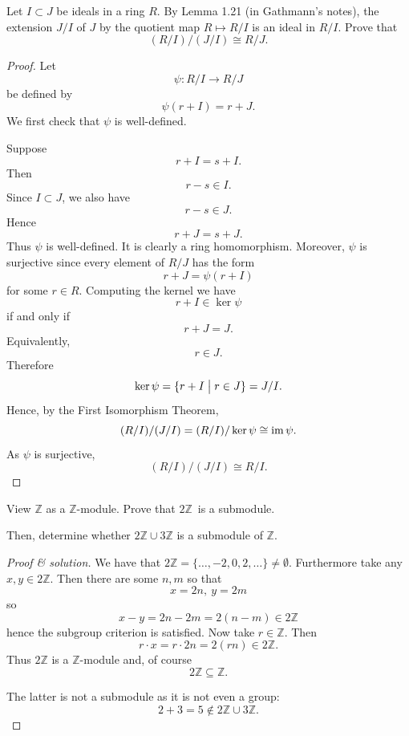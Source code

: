 \documentclass[11pt]{article}
\begin{document}
\begin{prob}[Gathmann 1.22]
    Let $I \subset J$ be ideals in a ring $R$. 
    By Lemma 1.21 (in Gathmann's notes), the extension 
    $J/I$ of $J$ by the quotient map $R \mapsto R/I$
    is an ideal in $R/I$. Prove that 
    \[
        (R/I)/(J/I) \cong R/J. 
    \]
    
\end{prob}
\begin{proof}
    Let 
    \[
        \psi : R/I \to R/J
    \]
    be defined by 
    \[
        \psi(r + I) = r + J.
    \]
    We first check that $\psi$ is well-defined. 

    Suppose 
    \[
        r + I = s + I. 
    \]
    Then 
    \[  
        r-s \in I. 
    \]
    Since $I \subset J$, we also have 
    \[
        r-s \in J. 
    \]
    Hence 
    \[
        r + J = s + J. 
    \]
    Thus $\psi$ is well-defined. 
    It is clearly a ring homomorphism. 
    Moreover, $\psi$ is surjective since every element 
    of $R/J$ has the form  
    \[
        r+J = \psi(r + I)
    \]
    for some $r \in R$. 
    Computing the kernel we have 
    \[
        r + I \in \ker \psi
    \]
    if and only if 
    \[
        r + J = J. 
    \]
    Equivalently, 
    \[
        r \in J. 
    \]
    Therefore 
    \[
        \ker \psi = \{r + I \bigm| r \in J\} = J/I. 
    \]
    Hence, by the First Isomorphism Theorem, 
    \[
        (R/I)/(J/I) = (R/I)/\ker\psi \cong \operatorname{im} \psi. 
    \]
    As $\psi$ is surjective, 
    \[
        (R/I)/(J/I) \cong R/I. 
    \]
\end{proof}

\begin{prob}
    View $\mathbb Z$ as a $\mathbb Z$-module. Prove that 
    $2\mathbb Z$ is a submodule. 

    Then, determine whether $2\mathbb Z \cup 3\mathbb Z$ is 
    a submodule of $\mathbb Z$.
\end{prob}
\begin{proof}[Proof \& solution]
    We have that $2\mathbb Z = \{\ldots, -2, 0, 2, \ldots\} \neq 
    \emptyset$. 
    Furthermore take any $x,y \in 2 \mathbb Z$. Then 
    there are some $n,m$ so that 
    \[
        x = 2n, \ y = 2m
    \]
    so 
    \[
        x - y = 2n - 2m = 2(n-m) \in 2\mathbb Z
    \]
    hence the subgroup criterion is satisfied. 
    Now take $r \in \mathbb Z$. 
    Then 
    \[
        r \cdot x = r \cdot 2n = 2(rn) \in 2\mathbb Z. 
    \]
    Thus $2\mathbb Z$ is a $\mathbb Z$-module and, of course 
    \[
        2\mathbb Z \subseteq \mathbb Z.
    \]

    The latter is not a submodule as it is not even a group: 
    \[
        2 + 3 = 5 \not\in2\mathbb Z \cup 3\mathbb Z.
    \]
\end{proof}
\end{document}
